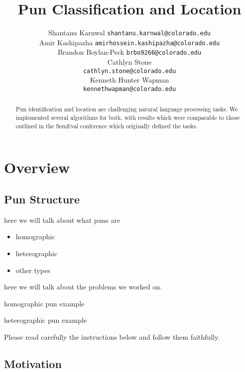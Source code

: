 \documentclass{article}
\title{Pun Classification and Location}
\author{
	Shantanu Karnwal
	\texttt{shantanu.karnwal@colorado.edu} \\
	\And
	Amir Kashipazha
	\texttt{amirhossein.kashipazha@colorado.edu} \\
	\And
	Brandon Boylan-Peck
	\texttt{brbo9266@colorado.edu} \\
	\And
	Cathlyn Stone\\
	\texttt{cathlyn.stone@colorado.edu} \\
	\And
	Kenneth Hunter Wapman\\
	\texttt{kennethwapman@colorado.edu} \\
}
\begin{document}
\maketitle

\begin{abstract}
	Pun identification and location are challenging natural language processing 
	tasks. We implemented several algorithms for both, with results which 
	were comparable to those outlined in the SemEval conference which originally
	defined the tasks.
\end{abstract}


\section{Overview}

\subsection{Pun Structure}

here we will talk about what puns are
\begin{itemize}

\item homographic
\item heterographic
\item other types

\end{itemize}

here we will talk about the problems we worked on.

\begin{center}
	homographic pun example
\end{center}

\begin{center}
	heterographic pun example
\end{center}

Please read carefully the instructions below and follow them
faithfully.

\subsection{Motivation}
\end{document}

